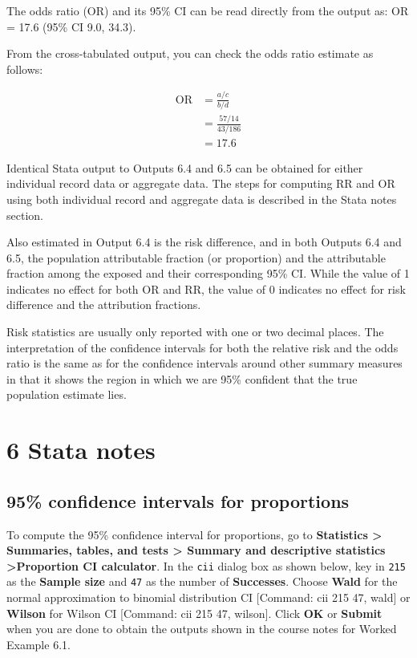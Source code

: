 \documentclass[
]{memoir}
\begin{document}
The odds ratio (OR) and its 95\% CI can be read directly from the output as: OR = 17.6 (95\% CI 9.0, 34.3).

From the cross-tabulated output, you can check the odds ratio estimate as follows:

\[
\begin{aligned}
\text{OR} &= \frac{a / c}{b /d} \\
  &= \frac{57 / 14}{43 / 186} \\
  &= 17.6
\end{aligned}
\]

Identical Stata output to Outputs 6.4 and 6.5 can be obtained for either individual record data or aggregate data. The steps for computing RR and OR using both individual record and aggregate data is described in the Stata notes section.

Also estimated in Output 6.4 is the risk difference, and in both Outputs 6.4 and 6.5, the population attributable fraction (or proportion) and the attributable fraction among the exposed and their corresponding 95\% CI. While the value of 1 indicates no effect for both OR and RR, the value of 0 indicates no effect for risk difference and the attribution fractions.

Risk statistics are usually only reported with one or two decimal places. The interpretation of the confidence intervals for both the relative risk and the odds ratio is the same as for the confidence intervals around other summary measures in that it shows the region in which we are 95\% confident that the true population estimate lies.

\hypertarget{stata-notes-4}{%
\chapter*{\texorpdfstring{\textbf{6} Stata notes}{6 Stata notes}}\label{stata-notes-4}}

\hypertarget{confidence-intervals-for-proportions}{%
\section{95\% confidence intervals for proportions}\label{confidence-intervals-for-proportions}}

To compute the 95\% confidence interval for proportions, go to \textbf{Statistics \textgreater{} Summaries, tables, and tests \textgreater{} Summary and descriptive statistics \textgreater Proportion CI calculator}. In the \texttt{cii} dialog box as shown below, key in \texttt{215} as the \textbf{Sample size} and \texttt{47} as the number of \textbf{Successes}. Choose \textbf{Wald} for the normal approximation to binomial distribution CI {[}Command: cii 215 47, wald{]} or \textbf{Wilson} for Wilson CI {[}Command: cii 215 47, wilson{]}. Click \textbf{OK} or \textbf{Submit} when you are done to obtain the outputs shown in the course notes for Worked Example 6.1.
\end{document}
